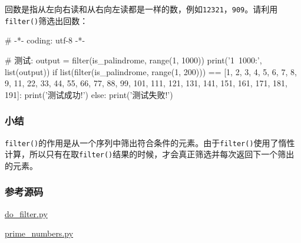 回数是指从左向右读和从右向左读都是一样的数，例如\texttt{12321}，\texttt{909}。请利用\texttt{filter()}筛选出回数：

\begin{pythoncode}
# -*- coding: utf-8 -*-
\end{pythoncode}

\begin{pythoncode}
# 测试:
output = filter(is_palindrome, range(1, 1000))
print('1~1000:', list(output))
if list(filter(is_palindrome, range(1, 200))) == [1, 2, 3, 4, 5, 6, 7, 8, 9, 11, 22, 33, 44, 55, 66, 77, 88, 99, 101, 111, 121, 131, 141, 151, 161, 171, 181, 191]:
    print('测试成功!')
else:
    print('测试失败!')
\end{pythoncode}

\hypertarget{ux5c0fux7ed3}{%
\subsubsection{小结}\label{ux5c0fux7ed3}}

\texttt{filter()}的作用是从一个序列中筛出符合条件的元素。由于\texttt{filter()}使用了惰性计算，所以只有在取\texttt{filter()}结果的时候，才会真正筛选并每次返回下一个筛出的元素。

\hypertarget{ux53c2ux8003ux6e90ux7801}{%
\subsubsection{参考源码}\label{ux53c2ux8003ux6e90ux7801}}

\href{https://github.com/michaelliao/learn-python3/blob/master/samples/functional/do_filter.py}{do\_filter.py}

\href{https://github.com/michaelliao/learn-python3/blob/master/samples/functional/prime_numbers.py}{prime\_numbers.py}

